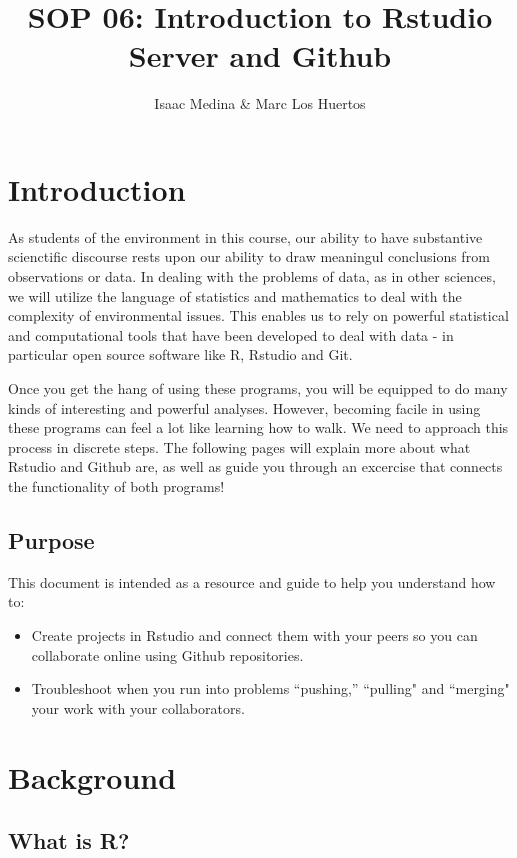\documentclass{article}\usepackage[]{graphicx}\usepackage[]{color}
\title{SOP 06: Introduction to Rstudio Server and Github}
\author{Isaac Medina \& Marc Los Huertos}
\begin{document}
\maketitle

\section{Introduction}
As students of the environment in this course, our ability to have substantive scienctific discourse rests upon our ability to draw meaningul conclusions from observations or data. In dealing with the problems of data, as in other sciences, we will utilize the language of statistics and mathematics to deal with the complexity of environmental issues. This enables us to rely on powerful statistical and computational tools that have been developed to deal with data - in particular open source software like R, Rstudio and Git. 

Once you get the hang of using these programs, you will be equipped to do many kinds of interesting and powerful analyses. However, becoming facile in using these programs can feel a lot like learning how to walk. We need to approach this process in discrete steps. The following pages will explain more about what Rstudio and Github are, as well as guide you through an excercise that connects the functionality of both programs!

  \subsection{Purpose}
  
This document is intended as a resource and guide to help you understand how to: 
  \begin{itemize}
  \item Create projects in Rstudio and connect them with your peers so you can collaborate online using Github repositories. 
  \item Troubleshoot when you run into problems ``pushing,'' ``pulling" and ``merging" your work with your collaborators.
  \end{itemize}
\section{Background}

  \subsection{What is R?}
\end{document}
